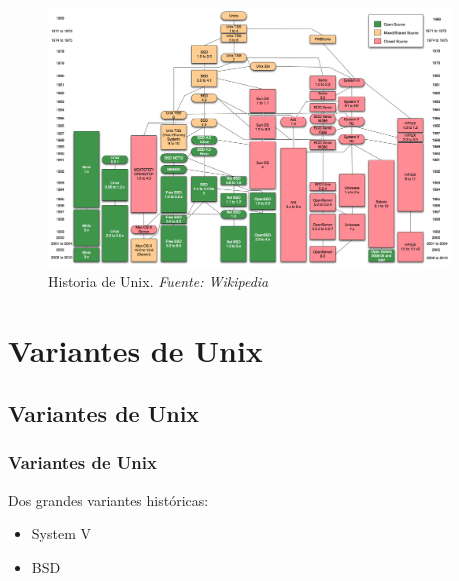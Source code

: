 \documentclass{beamer}
\begin{document}




\begin{frame}


\begin{figure}[h]

\begin{center}
  \includegraphics[height=2.7in]{figs/Unix_history-simple.png}
  \caption{{\footnotesize Historia de Unix. \textit{Fuente: Wikipedia}}}
\end{center}
\end{figure}


\end{frame}



\section{Variantes de Unix}
\subsection{Variantes de Unix}
\begin{frame}
\frametitle{Variantes de Unix}

Dos grandes variantes históricas:

\begin{itemize}
\item System V
\item BSD
\end{itemize}

\end{frame}
\end{document}
